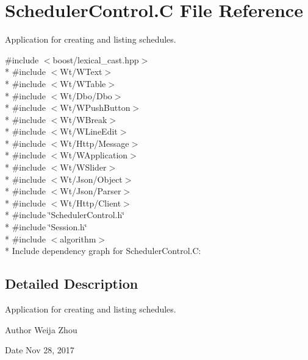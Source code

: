 \hypertarget{SchedulerControl_8C}{}\section{Scheduler\+Control.\+C File Reference}
\label{SchedulerControl_8C}


Application for creating and listing schedules.  


{\ttfamily \#include $<$boost/lexical\+\_\+cast.\+hpp$>$}\\*
{\ttfamily \#include $<$Wt/\+W\+Text$>$}\\*
{\ttfamily \#include $<$Wt/\+W\+Table$>$}\\*
{\ttfamily \#include $<$Wt/\+Dbo/\+Dbo$>$}\\*
{\ttfamily \#include $<$Wt/\+W\+Push\+Button$>$}\\*
{\ttfamily \#include $<$Wt/\+W\+Break$>$}\\*
{\ttfamily \#include $<$Wt/\+W\+Line\+Edit$>$}\\*
{\ttfamily \#include $<$Wt/\+Http/\+Message$>$}\\*
{\ttfamily \#include $<$Wt/\+W\+Application$>$}\\*
{\ttfamily \#include $<$Wt/\+W\+Slider$>$}\\*
{\ttfamily \#include $<$Wt/\+Json/\+Object$>$}\\*
{\ttfamily \#include $<$Wt/\+Json/\+Parser$>$}\\*
{\ttfamily \#include $<$Wt/\+Http/\+Client$>$}\\*
{\ttfamily \#include \char`\"{}Scheduler\+Control.\+h\char`\"{}}\\*
{\ttfamily \#include \char`\"{}Session.\+h\char`\"{}}\\*
{\ttfamily \#include $<$algorithm$>$}\\*
Include dependency graph for Scheduler\+Control.\+C\+:


\subsection{Detailed Description}
Application for creating and listing schedules. 

\begin{DoxyAuthor}{Author}
Weija Zhou 
\end{DoxyAuthor}
\begin{DoxyDate}{Date}
Nov 28, 2017 
\end{DoxyDate}
